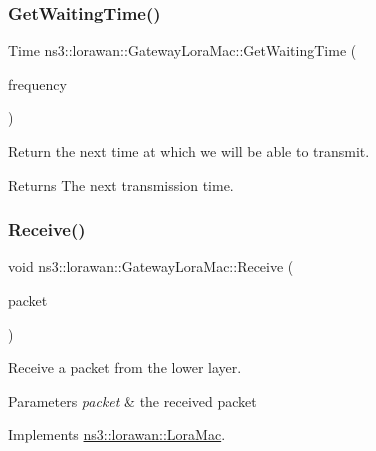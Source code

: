 \mbox{\label{classns3_1_1lorawan_1_1GatewayLoraMac_ae6271138c9d7b29e588e5b59d67b2c66}} 
\subsubsection{\texorpdfstring{Get\+Waiting\+Time()}{GetWaitingTime()}}
{\footnotesize\ttfamily Time ns3\+::lorawan\+::\+Gateway\+Lora\+Mac\+::\+Get\+Waiting\+Time (\begin{DoxyParamCaption}\item[{double}]{frequency }\end{DoxyParamCaption})}

Return the next time at which we will be able to transmit.

\begin{DoxyReturn}{Returns}
The next transmission time. 
\end{DoxyReturn}
\mbox{\label{classns3_1_1lorawan_1_1GatewayLoraMac_a8e53a57ec381d76bd47f51581b8c0df7}} 
\subsubsection{\texorpdfstring{Receive()}{Receive()}}
{\footnotesize\ttfamily void ns3\+::lorawan\+::\+Gateway\+Lora\+Mac\+::\+Receive (\begin{DoxyParamCaption}\item[{Ptr$<$ Packet const $>$}]{packet }\end{DoxyParamCaption})\hspace{0.3cm}{\ttfamily [virtual]}}

Receive a packet from the lower layer.


\begin{DoxyParams}{Parameters}
{\em packet} & the received packet \\
\hline
\end{DoxyParams}


Implements \hyperlink{classns3_1_1lorawan_1_1LoraMac_a6eda46656789a277b8e103afcefdc21a}{ns3\+::lorawan\+::\+Lora\+Mac}.

